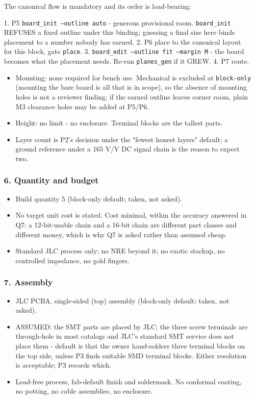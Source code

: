 \documentclass[11pt,a4paper]{article}
\begin{document}
The canonical flow is mandatory and its order is load-bearing:

1. P5 \texttt{board\_init --outline auto} - generous provisional room. \texttt{board\_init} REFUSES a fixed outline under this binding; guessing a final size here binds placement to a number nobody has earned. 2. P6 place to the canonical layout for this block, gate \texttt{place}. 3. \texttt{board\_edit --outline fit --margin M} - the board becomes what the placement needs. Re-run \texttt{planes\_gen} if it GREW. 4. P7 route.

\begin{itemize}
\item Mounting: none required for bench use. Mechanical is excluded at
\texttt{block-only} (mounting the bare board is all that is in scope), so the absence
of mounting holes is not a reviewer finding; if the earned outline leaves
corner room, plain M3 clearance holes may be added at P5/P6.
\item Height: no limit - no enclosure. Terminal blocks are the tallest parts.
\item Layer count is P2's decision under the "fewest honest layers" default; a
ground reference under a 165 V/V DC signal chain is the reason to expect two.
\end{itemize}
\subsubsection*{6. Quantity and budget}
\begin{itemize}
\item Build quantity 5 (block-only default; taken, not asked).
\item No target unit cost is stated. Cost minimal, within the accuracy answered in
Q7: a 12-bit-usable chain and a 16-bit chain are different part classes and
different money, which is why Q7 is asked rather than assumed cheap.
\item Standard JLC process only; no NRE beyond it; no exotic stackup, no controlled
impedance, no gold fingers.
\end{itemize}
\subsubsection*{7. Assembly}
\begin{itemize}
\item JLC PCBA, single-sided (top) assembly (block-only default; taken, not asked).
\item ASSUMED: the SMT parts are placed by JLC; the three screw terminals are
through-hole in most catalogs and JLC's standard SMT service does not place
them - default is that the owner hand-solders three terminal blocks on the top
side, unless P3 finds suitable SMD terminal blocks. Either resolution is
acceptable; P3 records which.
\item Lead-free process, fab-default finish and soldermask. No conformal coating, no
potting, no cable assemblies, no enclosure.
\end{itemize}
\end{document}
